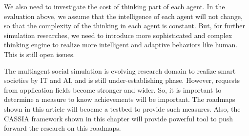 We also need to investigate the cost of thinking part of each agent.
In the evaluation above, we assume that the intelligence of each
agent will not change, so that the complexity of the thinking
in each agent is constant.
But, for further simulation researches, we need to introduce
more sophisticated and complex thinking engine to
realize more intelligent and adaptive behaviors like human.
This is still open issues. 

The multiagent social simulation
is evolving research domain to realize smart societies by IT and AI,
and is still under-establishing phase.
However, requests from application fields become stronger and wider.
So, it is important to determine a measure to know achievements will
be important.  
The roadmaps shown in this article will beocme a testbed to provide
such measures.
Also, the CASSIA framework shown in this chapter
will provide powerful tool to push forward the research on this
roadmaps.


